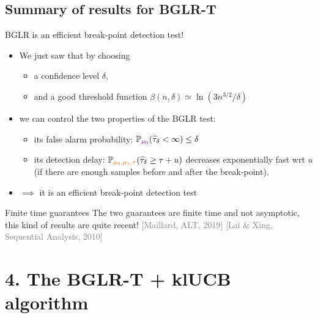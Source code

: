 \documentclass[11pt,english,ignorenonframetext,]{beamer}
\providecommand{\tightlist}{%
  \setlength{\itemsep}{0pt}\setlength{\parskip}{0pt}}
\begin{document}
\subsection{\hfill{}Summary of results for BGLR-T\hfill{}}

\begin{frame}{BGLR is an efficient break-point detection test!}

  \begin{itemize}
    \item
    We just saw that by choosing
    \begin{itemize}\tightlist
      \item
      a confidence level $\delta$,
      \item
      and a good threshold function $\beta(n,\delta) \simeq \ln(3n^{3/2}/\delta)$
    \end{itemize}
    \item
    we can control the two properties of the BGLR test:
    \begin{itemize}\tightlist
      \item
        its \alert{false alarm probability}:
        $\mathbb{P}_{\textcolor{darkpurple}{\mu_0}}(\widehat{\tau}_\delta < \infty) \leq \delta$
      \item
        its \alert{detection delay}:
        $\mathbb{P}_{\textcolor{meca}{\mu_0,\mu_1,\tau}} (\widehat{\tau}_{\delta} \geq \tau + u)$ decreases exponentially fast wrt $u$
      (if there are enough samples before and after the break-point).
    \end{itemize}

    \item
    $\implies$ it is an efficient break-point detection test
  \end{itemize}

  \pause
  \begin{block}{Finite time guarantees}
    The two guarantees are \alert{finite time} and not asymptotic, this kind of results are quite recent!
    \hfill{}
    {\tiny
      \textcolor{gray}{[Maillard, ALT, 2019]}
      \textcolor{gray}{[Lai \& Xing, Sequential Analysis, 2010]}
    }
  \end{block}

\end{frame}

\section{\hfill{}4. The BGLR-T + klUCB algorithm\hfill{}}
\end{document}
